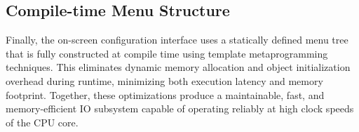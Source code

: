 \subsection{Compile-time Menu Structure} Finally, the on-screen configuration interface uses a statically defined menu tree that is fully constructed at compile time using template metaprogramming techniques. This eliminates dynamic memory allocation and object initialization overhead during runtime, minimizing both execution latency and memory footprint. Together, these optimizations produce a maintainable, fast, and memory-efficient IO subsystem capable of operating reliably at high clock speeds of the CPU core.
\vfill

\begin{lstfloat}[H]
  
  \caption{The IO system's menu tree is defined as a type and built at compile-time.}
  \label{lst:menu}
\end{lstfloat}
